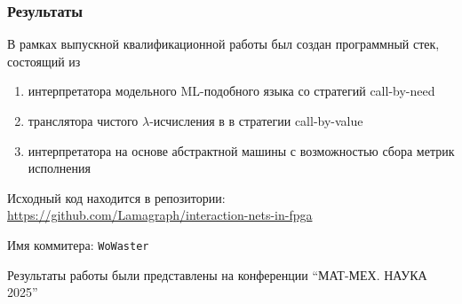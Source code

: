 \documentclass
  [ russian
  , aspectratio=169 %
  ] {beamer}
\begin{document}
\begin{frame}
    \frametitle{Результаты}
    В рамках выпускной квалификационной работы был создан программный стек, состоящий из
    \begin{enumerate}
        \item интерпретатора модельного ML-подобного языка со стратегий call-by-need
        \item транслятора чистого $\lambda$-исчисления в \INs{} в стратегии call-by-value
        \item интерпретатора \INs{} на основе абстрактной машины с возможностью сбора метрик исполнения
    \end{enumerate}

    \vspace{1em}

    Исходный код находится в репозитории: \url{https://github.com/Lamagraph/interaction-nets-in-fpga}

    Имя коммитера: \texttt{WoWaster}

    \vspace{1em}

    Результаты работы были представлены на конференции \enquote{МАТ-МЕХ. НАУКА 2025}
\end{frame}

\appendix
\end{document}

